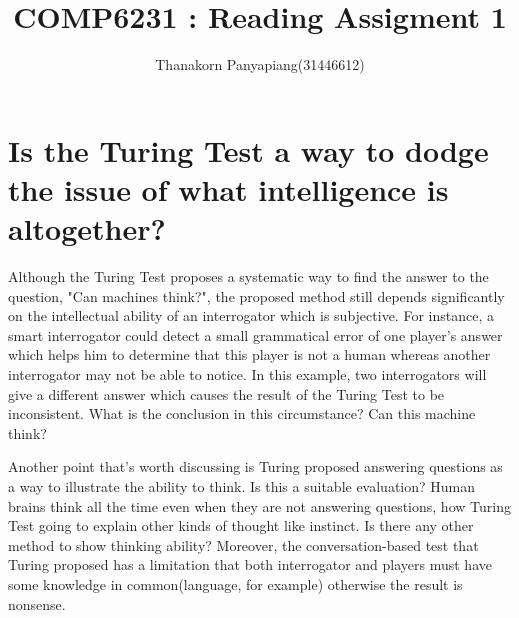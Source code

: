 \documentclass{article}
\title{COMP6231 : Reading Assigment 1}
\author{Thanakorn Panyapiang(31446612)}
\begin{document}
\maketitle
\section*{Is the Turing Test a way to dodge the issue of what intelligence is altogether?}

Although the Turing Test proposes a systematic way to find the answer to the question, "Can machines think?", the proposed method still depends significantly on the intellectual ability of an interrogator which is subjective. For instance, a smart interrogator could detect a small grammatical error of one player's answer which helps him to determine that this player is not a human whereas another interrogator may not be able to notice. In this example, two interrogators will give a different answer which causes the result of the Turing Test to be inconsistent. What is the conclusion in this circumstance? Can this machine think?

Another point that's worth discussing is Turing proposed answering questions as a way to illustrate the ability to think. Is this a suitable evaluation? Human brains think all the time even when they are not answering questions, how Turing Test going to explain other kinds of thought like instinct. Is there any other method to show thinking ability? Moreover, the conversation-based test that Turing proposed has a limitation that both interrogator and players must have some knowledge in common(language, for example) otherwise the result is nonsense. 
\end{document}
